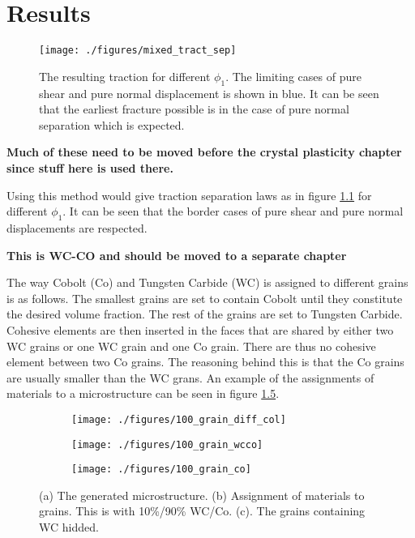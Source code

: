 \documentclass[wcco.tex]{subfiles}
\begin{document}
\chapter{Results}

\begin{figure}[h]
\centering
  \texttt{[image: ./figures/mixed\_tract\_sep]}
\caption{The resulting traction for different $\phi_1$. The limiting cases of pure shear and pure normal displacement is shown in blue. It can be seen that the earliest fracture possible is in the case of pure normal separation which is expected. }
\label{fig:mixed_tract_sep}
\end{figure}

\textbf{Much of these need to be moved before the crystal plasticity chapter since stuff here is used there.}

Using this method would give traction separation laws as in figure \ref{fig:mixed_tract_sep} for different $\phi_1$. It can be seen that the border cases of pure shear and pure normal displacements are respected.


\textbf{This is WC-CO and should be moved to a separate chapter}

The way Cobolt (Co) and Tungsten Carbide (WC) is assigned to different grains is as follows. The smallest grains are set to contain Cobolt until they constitute the desired volume fraction. The rest of the grains are set to Tungsten Carbide. Cohesive elements are then inserted in the faces that are shared by either two WC grains or one WC grain and one Co grain. There are thus no cohesive element between two Co grains. The reasoning behind this is that the Co grains are usually smaller than the WC grans.  An example of the assignments of materials to a microstructure can be seen in figure \ref{fig:cowc}.

\begin{figure}
\centering
\begin{subfigure}[b]{.5\textwidth}
  \centering
  \texttt{[image: ./figures/100\_grain\_diff\_col]}
  \caption{}
  \label{fig:cowc_a}
\end{subfigure}%
\hspace{-10mm}
\begin{subfigure}[b]{.5\textwidth}
  \centering
  \texttt{[image: ./figures/100\_grain\_wcco]}
  \caption{}
  \label{fig:cowc_b}
\end{subfigure}%
\hspace{-10mm}
\begin{subfigure}[b]{.5\textwidth}
  \centering
  \texttt{[image: ./figures/100\_grain\_co]}
  \caption{}
  \label{fig:cowc_c}
\end{subfigure}
\caption{(a) The generated microstructure. (b) Assignment of materials to grains. This is with 10\%/90\% WC/Co. (c). The grains containing WC hidded.}
\label{fig:cowc}
\end{figure}
\end{document}
